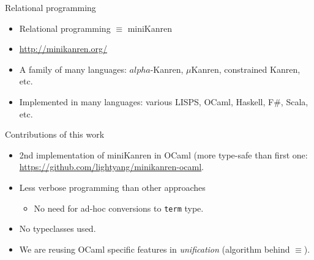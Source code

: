 \documentclass [mathserif]{beamer}
\theoremstyle{definition}
\begin{document}
\begin{frame}{Relational programming}

\begin{itemize}
 \item Relational programming $\equiv$ miniKanren
 \item \url{ http://minikanren.org/}
 \item A family of many languages: $alpha$-Kanren, $\mu$Kanren, constrained Kanren, etc.
 \item Implemented in many languages: various LISPS, OCaml, Haskell, F\#, Scala, etc.
\end{itemize}
 
\end{frame}

\begin{frame}{Contributions of this work}
\begin{itemize}
 \item 2nd implementation of miniKanren in OCaml (more type-safe than first one: 
   \url{https://github.com/lightyang/minikanren-ocaml}.
 \item Less verbose programming than other approaches
   \begin{itemize}
    \item No need for ad-hoc conversions to \texttt{term} type.
   \end{itemize}
  \item No typeclasses used.
  \item We are reusing OCaml specific features in \textit{unification} (algorithm behind $\equiv$).
\end{itemize}
\end{frame}
\end{document}
